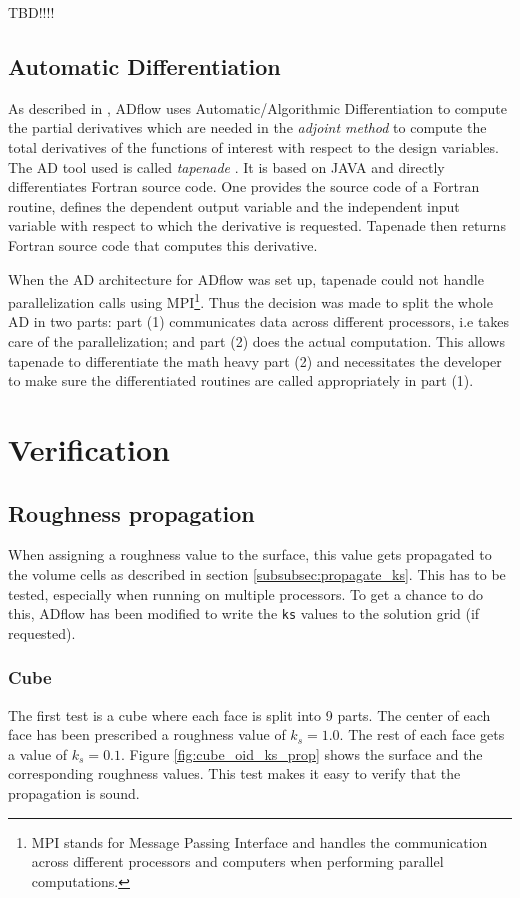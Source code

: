 TBD!!!!

\subsection{Automatic Differentiation}
As described in \cite{cm1}, ADflow uses Automatic/Algorithmic Differentiation to
compute the partial derivatives which are needed in the \textit{adjoint method}
to compute the total derivatives of the functions of interest with respect to
the design variables. The AD tool used is called \textit{tapenade}
\cite{tapenade}. It is based on JAVA and directly differentiates Fortran source
code. One provides the source code of a Fortran routine, defines the dependent
output variable and the independent input variable with respect to which the
derivative is requested. Tapenade then returns Fortran source code that
computes this derivative.

When the AD architecture for ADflow was set up, tapenade could not handle
parallelization calls using MPI\footnote{MPI stands for Message Passing
Interface and handles the communication across different processors and
computers when performing parallel computations.}. Thus the decision was made to
split the whole AD in two parts: part (1) communicates data across different
processors, i.e takes care of the parallelization; and part (2) does the actual
computation. This allows tapenade to differentiate the math heavy part (2) and
necessitates the developer to make sure the differentiated routines are called
appropriately in part (1).


\section{Verification}

\subsection{Roughness propagation}
\label{subsec:roughness_prop}
When assigning a roughness value to the surface, this value gets propagated to
the volume cells as described in section \ref{subsubsec:propagate_ks}. This has
to be tested, especially when running on multiple processors. To get a chance to
do this, ADflow has been modified to write the \texttt{ks} values to the
solution grid (if requested).

\subsubsection{Cube}
The first test is a cube where each face is split into 9 parts. The center of
each face has been prescribed a roughness value of $k_{s} = 1.0$. The rest of
each face gets a value of $k_{s} = 0.1$. Figure \ref{fig:cube_oid_ks_prop} shows
the surface and the corresponding roughness values. This test makes it easy to
verify that the propagation is sound.

